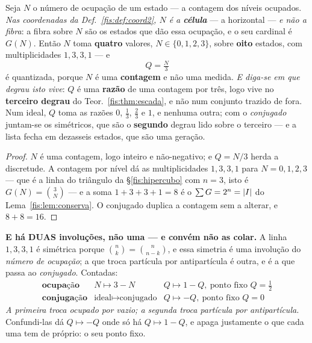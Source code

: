 \documentclass[livro.tex]{subfiles}
\begin{document}
\begin{teorema}\label{fis:thm:carga}
Seja $N$ o número de ocupação de um estado --- a contagem dos níveis ocupados.
\emph{Nas coordenadas da Def.~\ref{fis:def:coord2}, $N$ é a \textbf{célula}} --- a
horizontal --- \emph{e não a fibra}: a fibra sobre $N$ são os estados que dão essa
ocupação, e o seu cardinal é $G(N)$. Então $N$ toma
\textbf{quatro} valores, $N\in\{0,1,2,3\}$, sobre \textbf{oito} estados, com
multiplicidades $1,3,3,1$ --- e
\[
\boxed{\;Q=\tfrac{N}{3}\;}
\]
é quantizada, porque $N$ é uma \textbf{contagem} e não uma medida. \emph{E
diga-se em que degrau isto vive}: $Q$ é uma \textbf{razão} de uma contagem por
três, logo vive no \textbf{terceiro degrau} do Teor.~\ref{fis:thm:escada}, e não
num conjunto trazido de fora. Num ideal, $Q$ toma as razões $0$, $\tfrac13$,
$\tfrac23$ e $1$, e nenhuma outra; com o \emph{conjugado} juntam-se os
simétricos, que são o \textbf{segundo} degrau lido sobre o terceiro --- e a lista
fecha em dezasseis estados, que são uma geração.
\end{teorema}

\begin{proof}
$N$ é uma contagem, logo inteiro e não-negativo; e $Q=N/3$ herda a discretude. A
contagem por nível dá as multiplicidades $1,3,3,1$ para $N=0,1,2,3$ --- que é a
linha do triângulo da §\ref{fis:hipercubo} com $n=3$, isto é $G(N)=\binom{3}{N}$
--- e a soma $1+3+3+1=8$ é o
$\sum G=2^{n}=\lvert I\rvert$ do Lema~\ref{fis:lem:conserva}. O conjugado duplica a
contagem sem a alterar, e $8+8=16$.
\end{proof}

\medskip\noindent\textbf{E há DUAS involuções, não uma --- e convém não as
colar.} A linha $1,3,3,1$ é simétrica porque $\binom{n}{k}=\binom{n}{n-k}$, e essa
simetria é uma involução do \emph{número de ocupação}; a que troca partícula por
antipartícula é outra, e é a que passa ao \emph{conjugado}. Contadas:
\[
\begin{array}{lll}
\textbf{ocupação} & N\mapsto3-N & Q\mapsto1-Q,\ \text{ponto fixo }Q=\tfrac12\\[2pt]
\textbf{conjugação} & \text{ideal}\mapsto\text{conjugado} & Q\mapsto-Q,\ \text{ponto fixo }Q=0
\end{array}
\]
\emph{A primeira troca ocupado por vazio; a segunda troca partícula por
antipartícula.} Confundi-las dá $Q\mapsto-Q$ onde só há $Q\mapsto1-Q$, e apaga
justamente o que cada uma tem de próprio: o seu ponto fixo.
\end{document}
